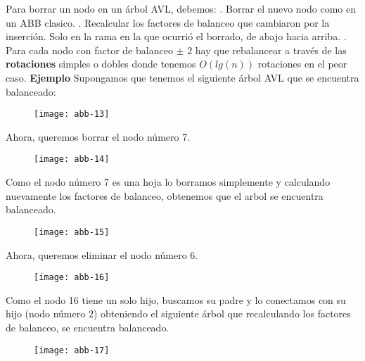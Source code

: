 \documentclass[10pt,a4paper]{article}
\begin{document}
Para borrar un nodo en un árbol AVL, debemos:
\newline
{}. Borrar el nuevo nodo como en un ABB clasico. \newline
{}. Recalcular los factores de balanceo que cambiaron por la inserción. Solo en la rama en la que ocurrió el borrado, de abajo hacia arriba.
\newline
{}. Para cada nodo con factor de balanceo $\pm$ 2 hay que rebalancear a través de las \textbf{rotaciones} simples o dobles donde tenemos $O(lg(n))$ rotaciones en el peor caso.
\newline
\newline
\textbf{Ejemplo}
\newline
\newline
Supongamos que tenemos el siguiente árbol AVL que se encuentra balanceado:

\begin{figure}[h]
	\centering
\texttt{[image: abb-13]}
	\label{drivers1}
\end{figure}

Ahora, queremos borrar el nodo número 7.

\begin{figure}[h]
	\centering
\texttt{[image: abb-14]}
	\label{drivers1}
\end{figure}
\newpage
Como el nodo número 7 es una hoja lo borramos simplemente y calculando nuevamente los factores de balanceo, obtenemos que el arbol se encuentra balanceado. 

\begin{figure}[h]
	\centering
\texttt{[image: abb-15]}
	\label{drivers1}
\end{figure}

Ahora, queremos eliminar el nodo número 6.

\begin{figure}[h]
	\centering
\texttt{[image: abb-16]}
	\label{drivers1}
\end{figure}
\newpage

Como el nodo 16 tiene un solo hijo, buscamos su padre y lo conectamos con su hijo (nodo número 2) obteniendo el siguiente árbol que recalculando los factores de balanceo, se encuentra balanceado. 

\begin{figure}[h]
	\centering
\texttt{[image: abb-17]}
	\label{drivers1}
\end{figure}
\end{document}
